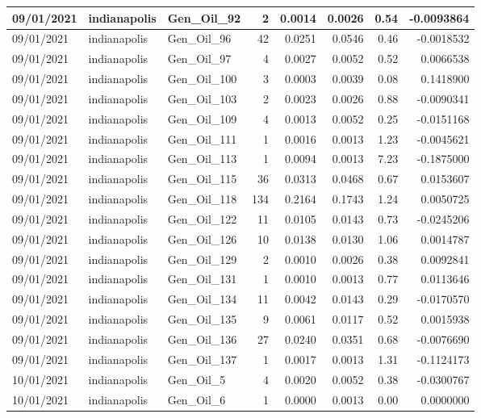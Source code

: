 \documentclass[
  letterpaper,
  DIV=11,
  numbers=noendperiod]{scrartcl}
\begin{document}
\begin{tabular}{l|l|l|r|r|r|r|r}
\hline
09/01/2021 & indianapolis & Gen\_Oil\_92 & 2 & 0.0014 & 0.0026 & 0.54 & -0.0093864\\
\hline
09/01/2021 & indianapolis & Gen\_Oil\_96 & 42 & 0.0251 & 0.0546 & 0.46 & -0.0018532\\
\hline
09/01/2021 & indianapolis & Gen\_Oil\_97 & 4 & 0.0027 & 0.0052 & 0.52 & 0.0066538\\
\hline
09/01/2021 & indianapolis & Gen\_Oil\_100 & 3 & 0.0003 & 0.0039 & 0.08 & 0.1418900\\
\hline
09/01/2021 & indianapolis & Gen\_Oil\_103 & 2 & 0.0023 & 0.0026 & 0.88 & -0.0090341\\
\hline
09/01/2021 & indianapolis & Gen\_Oil\_109 & 4 & 0.0013 & 0.0052 & 0.25 & -0.0151168\\
\hline
09/01/2021 & indianapolis & Gen\_Oil\_111 & 1 & 0.0016 & 0.0013 & 1.23 & -0.0045621\\
\hline
09/01/2021 & indianapolis & Gen\_Oil\_113 & 1 & 0.0094 & 0.0013 & 7.23 & -0.1875000\\
\hline
09/01/2021 & indianapolis & Gen\_Oil\_115 & 36 & 0.0313 & 0.0468 & 0.67 & 0.0153607\\
\hline
09/01/2021 & indianapolis & Gen\_Oil\_118 & 134 & 0.2164 & 0.1743 & 1.24 & 0.0050725\\
\hline
09/01/2021 & indianapolis & Gen\_Oil\_122 & 11 & 0.0105 & 0.0143 & 0.73 & -0.0245206\\
\hline
09/01/2021 & indianapolis & Gen\_Oil\_126 & 10 & 0.0138 & 0.0130 & 1.06 & 0.0014787\\
\hline
09/01/2021 & indianapolis & Gen\_Oil\_129 & 2 & 0.0010 & 0.0026 & 0.38 & 0.0092841\\
\hline
09/01/2021 & indianapolis & Gen\_Oil\_131 & 1 & 0.0010 & 0.0013 & 0.77 & 0.0113646\\
\hline
09/01/2021 & indianapolis & Gen\_Oil\_134 & 11 & 0.0042 & 0.0143 & 0.29 & -0.0170570\\
\hline
09/01/2021 & indianapolis & Gen\_Oil\_135 & 9 & 0.0061 & 0.0117 & 0.52 & 0.0015938\\
\hline
09/01/2021 & indianapolis & Gen\_Oil\_136 & 27 & 0.0240 & 0.0351 & 0.68 & -0.0076690\\
\hline
09/01/2021 & indianapolis & Gen\_Oil\_137 & 1 & 0.0017 & 0.0013 & 1.31 & -0.1124173\\
\hline
10/01/2021 & indianapolis & Gen\_Oil\_5 & 4 & 0.0020 & 0.0052 & 0.38 & -0.0300767\\
\hline
10/01/2021 & indianapolis & Gen\_Oil\_6 & 1 & 0.0000 & 0.0013 & 0.00 & 0.0000000\\

\end{tabular}
\end{document}
